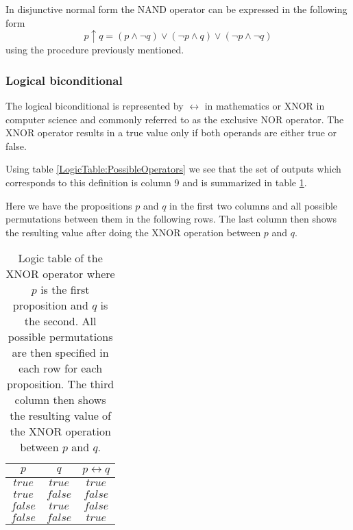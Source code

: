                 In disjunctive normal form the NAND operator can be expressed in the following form
                \begin{equation}
                    p \uparrow q = (p \wedge \neg q) \vee (\neg p \wedge q) \vee (\neg p \wedge \neg q)
                \end{equation}
                using the procedure previously mentioned.
                
            \subsubsection{Logical biconditional}
               The logical biconditional is represented by $\leftrightarrow$ in mathematics or XNOR in computer science and commonly referred to as the exclusive NOR operator. The XNOR operator results in a true value only if both operands are either true or false.
               
               Using table \ref{LogicTable:PossibleOperators} we see that the set of outputs which corresponds to this definition is column 9 and is summarized in table \ref{LogicTable:XNOR}.
               
               Here we have the propositions $p$ and $q$ in the first two columns and all possible permutations between them in the following rows. The last column then shows the resulting value after doing the XNOR operation between $p$ and $q$.
               
               \begin{table}[h!]
                   \centering
                   \begin{tabular}{|c|c|c|}
                   	\hline
                   	  $p$   &   $q$   & $p \leftrightarrow q$ \\ \hline
                   	$true$  & $true$  &        $true$         \\ \hline
                   	$true$  & $false$ &        $false$        \\ \hline
                   	$false$ & $true$  &        $false$        \\ \hline
                   	$false$ & $false$ &        $true$         \\ \hline
                   \end{tabular}
                   \caption{Logic table of the XNOR operator where $p$ is the first proposition and $q$ is the second. All possible permutations are then specified in each row for each proposition. The third column then shows the resulting value of the XNOR operation between $p$ and $q$.}
                   \label{LogicTable:XNOR}
               \end{table}
           
